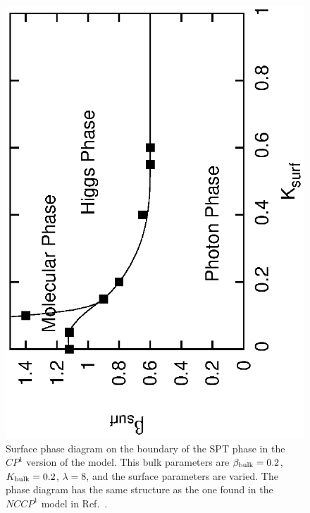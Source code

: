 \documentclass[prb,twocolumn]{revtex4-1}
\begin{document}
\begin{figure}
\includegraphics[angle=-90,width=0.9\linewidth]{figures/cp1surfphase.eps}
\caption{Surface phase diagram on the boundary of the SPT phase in the $CP^1$ version of the model. This bulk parameters are $\beta_{\rm bulk}=0.2$, $K_{\rm bulk}=0.2$, $\lambda=8$, and the surface parameters are varied. The phase diagram has the same structure as the one found in the $NCCP^1$ model in Ref.~. }
\label{cp1surfphase}
\end{figure}
\end{document}
